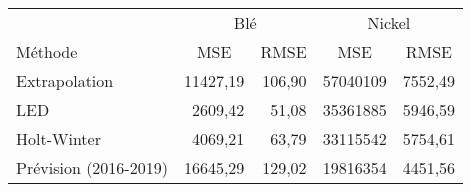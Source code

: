 \begin{tabular}{lrrrr}
\toprule
& \multicolumn{2}{c}{Blé} & \multicolumn{2}{c}{Nickel} \\
Méthode & \multicolumn{1}{c}{MSE} & \multicolumn{1}{c}{RMSE} & \multicolumn{1}{c}{MSE} & \multicolumn{1}{c}{RMSE} \\
\cmidrule(r){1-1}\cmidrule(lr){2-3}\cmidrule(lr){4-5}
Extrapolation   & 11427,19 & 106,90 & 57040109 & 7552,49 \\
LED & 2609,42 & 51,08 & 35361885 & 5946,59 \\
Holt-Winter & 4069,21 & 63,79 & 33115542 & 5754,61 \\
\cmidrule(r){1-1}\cmidrule(lr){2-3}\cmidrule(lr){4-5}
Prévision (2016-2019)  &16645,29 & 129,02 &	19816354 &	4451,56 \\
\bottomrule
\end{tabular}%
